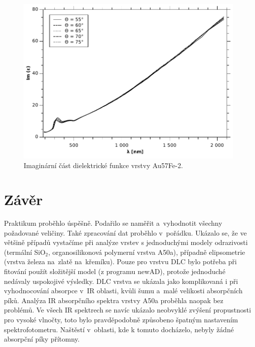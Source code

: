 \documentclass[12pt]{article}
\begin{document}
\begin{figure}
  \centering
  \includegraphics[width=135mm]{img/Au-Ime.pdf}
  \caption{Imaginární část dielektrické funkce vrstvy Au57Fe-2.}
  \label{AuIme}
\end{figure}

\section{Závěr}
Praktikum proběhlo úspěšně. Podařilo se naměřit a~vyhodnotit všechny požadované veličiny. Také zpracování dat proběhlo v~pořádku. Ukázalo se, že ve většině případů vystačíme při analýze vrstev s jednoduchými modely odrazivosti (termální SiO$_2$, organosilikonová polymerní vrstva A50a), případně elipsometrie (vrstva železa na~zlatě na~křemíku). Pouze pro vrstvu DLC bylo potřeba při fitování použít složitější model (z programu newAD), protože jednoduché nedávaly uspokojivé výsledky. DLC vrstva se ukázala jako komplikovaná i při vyhodnocování absorpce v~IR oblasti, kvůli šumu a~malé velikosti absorpčních píků. Analýza IR absorpčního spektra vrstvy A50a proběhla naopak bez problémů. Ve všech IR spektrech se navíc ukázalo neobvyklé zvýšení propustnosti pro vysoké vlnočty, toto bylo pravděpodobně způsobeno špatným nastavením spektrofotometru. Naštěstí v~oblasti, kde k tomuto docházelo, nebyly žádné absorpční píky přítomny. 
\end{document}
